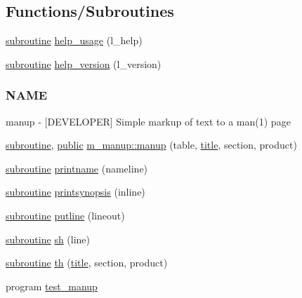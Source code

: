 \subsection*{Functions/\+Subroutines}
\begin{DoxyCompactItemize}
\item 
\hyperlink{M__stopwatch_83_8txt_acfbcff50169d691ff02d4a123ed70482}{subroutine} \hyperlink{manup_8f90_a3e09a3b52ee8fb04eeb93fe5761626a8}{help\+\_\+usage} (l\+\_\+help)
\item 
\hyperlink{M__stopwatch_83_8txt_acfbcff50169d691ff02d4a123ed70482}{subroutine} \hyperlink{manup_8f90_a39c21619b08a3c22f19e2306efd7f766}{help\+\_\+version} (l\+\_\+version)
\begin{DoxyCompactList}\small\item\em \subsubsection*{N\+A\+ME}

manup -\/ \mbox{[}D\+E\+V\+E\+L\+O\+P\+ER\mbox{]} Simple markup of text to a man(1) page \end{DoxyCompactList}\item 
\hyperlink{M__stopwatch_83_8txt_acfbcff50169d691ff02d4a123ed70482}{subroutine}, \hyperlink{M__stopwatch_83_8txt_a2f74811300c361e53b430611a7d1769f}{public} \hyperlink{namespacem__manup_a2d0a043fa0f6b2ca01e2eb4747ef4bbd}{m\+\_\+manup\+::manup} (table, \hyperlink{print__watch_83_8txt_a15b5bd21156bb9fca6a755ab8c029a9c}{title}, section, product)
\item 
\hyperlink{M__stopwatch_83_8txt_acfbcff50169d691ff02d4a123ed70482}{subroutine} \hyperlink{manup_8f90_a12de453acb5b104d198da168695af410}{printname} (nameline)
\item 
\hyperlink{M__stopwatch_83_8txt_acfbcff50169d691ff02d4a123ed70482}{subroutine} \hyperlink{manup_8f90_aabf73d1c2ef02028690008788b8a1f9d}{printsynopsis} (inline)
\item 
\hyperlink{M__stopwatch_83_8txt_acfbcff50169d691ff02d4a123ed70482}{subroutine} \hyperlink{manup_8f90_a4b6c4dc9df113c44655bdf0f96ed6018}{putline} (lineout)
\item 
\hyperlink{M__stopwatch_83_8txt_acfbcff50169d691ff02d4a123ed70482}{subroutine} \hyperlink{manup_8f90_ae720ba239fabc9a2eefd18acea10cc90}{sh} (line)
\item 
\hyperlink{M__stopwatch_83_8txt_acfbcff50169d691ff02d4a123ed70482}{subroutine} \hyperlink{manup_8f90_ad056917b9c1db52352c327beadced6d0}{th} (\hyperlink{print__watch_83_8txt_a15b5bd21156bb9fca6a755ab8c029a9c}{title}, section, product)
\item 
program \hyperlink{manup_8f90_a5941828c1341a0298a7b0c0c5789ff35}{test\+\_\+manup}
\end{DoxyCompactItemize}


